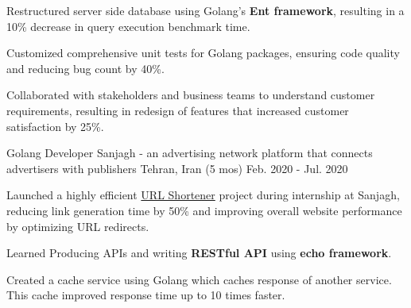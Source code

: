 \begin{cventries}
{\begin{cvitems}
\begin{itemize}
        \end{itemize}
        \item Restructured server side database using Golang's \textbf{Ent framework}, resulting in a 10\% decrease in query execution benchmark time.
        \item Customized comprehensive unit tests for Golang packages, ensuring code quality and reducing bug count by 40\%.
        \item Collaborated with stakeholders and business teams to understand customer requirements, resulting in redesign of features that increased customer satisfaction by 25\%.
      \end{cvitems}
    }

  \cventry
    {Golang Developer} %
    {Sanjagh - \textnormal{an advertising network platform that connects advertisers with publishers}} %
    {Tehran, Iran} %
    {(5 mos) Feb. 2020 - Jul. 2020} %
    {
      \begin{cvitems} %
        \item Launched a highly efficient \href{https://github.com/pooria1/url-shortener}{URL Shortener} project during internship at Sanjagh, reducing link generation time by 50\% and improving overall website performance by optimizing URL redirects.
        \item Learned Producing APIs and writing \textbf{RESTful API} using \textbf{echo framework}.
        \item Created a cache service using Golang which caches response of another service. This cache improved response time up to 10 times faster.
      \end{cvitems}
    }

\end{cventries}
